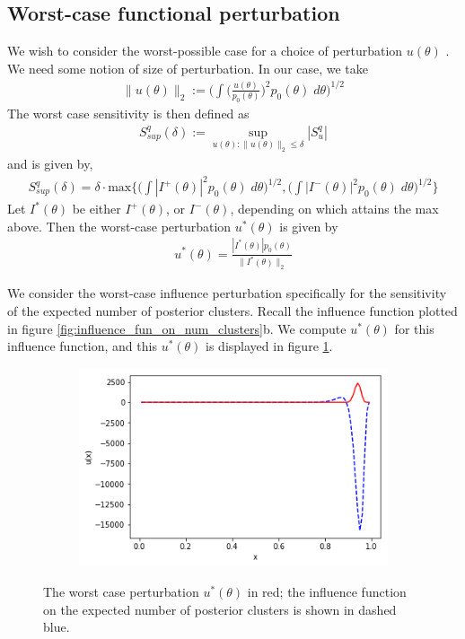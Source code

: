 \documentclass[a4paper]{article}
\begin{document}
\subsection{Worst-case functional perturbation}
We wish to consider the worst-possible case for a choice of perturbation
$u(\theta)$ \cite{giordano_2017}.
We need some notion of size of perturbation. In our case, we take
\begin{align}
	\|u(\theta)\|_2 := \Big(\int \Big(\frac{u(\theta)}{p_0(\theta)}\Big)^2 p_0(\theta) \; d\theta\Big)^{1/2}
\end{align}
The worst case sensitivity is then defined as
\begin{align}
	S_{sup}^q(\delta) := \sup_{u(\theta) : \|u(\theta)\|_2 \leq \delta} |S_u^q|
\end{align}
and is given by,
\begin{align}
	S_{sup}^q(\delta) = \delta \cdot \text{max} \Big\{\Big(\int|I^+(\theta)|^2p_0(\theta)\; d\theta\Big)^{1/2},
	\Big(\int|I^-(\theta)|^2p_0(\theta)\;d\theta\Big)^{1/2} \Big\}
\end{align}
Let $I^*(\theta)$ be either $I^+(\theta)$, or $I^-(\theta)$, depending on
which attains the max above. Then the worst-case perturbation $u^*(\theta)$
is given by
\begin{align}
	u^*(\theta) = \frac{|I^*(\theta)| p_0(\theta)}{\|I^*(\theta)\|_2}
\end{align}

We consider the worst-case influence perturbation specifically for the sensitivity
of the expected number of posterior clusters. Recall the influence function plotted in
figure \ref{fig:influence_fun_on_num_clusters}b. We compute $u^*(\theta)$ for this
influence function, and this $u^*(\theta)$ is displayed in figure \ref{fig:worst_case_num_clust}.

\begin{figure}[h!]
	\centering
	\begin{subfigure}[t]{0.4\textwidth}
		\includegraphics[width = \textwidth]{./functional_sensitivity_figs/worst_case_influence.png}
	\end{subfigure}
	\caption{The worst case perturbation $u^*(\theta)$ in red; the influence function on the
	expected number of posterior clusters is shown in dashed blue. }
	\label{fig:worst_case_num_clust}
\end{figure}
\end{document}
